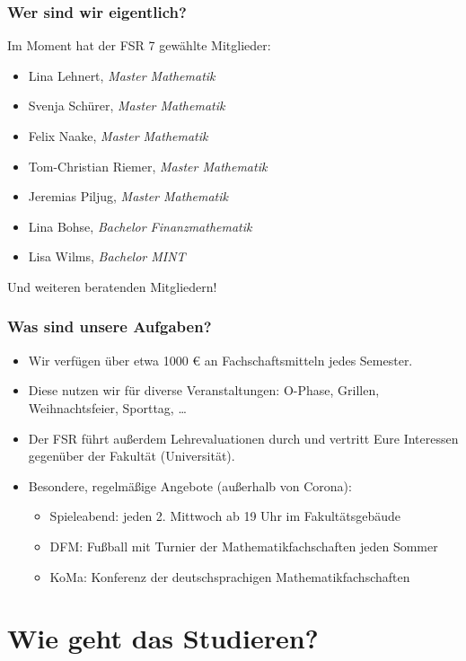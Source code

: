 \documentclass[10pt]{beamer}
\begin{document}
\begin{frame}
	\frametitle{Wer sind wir eigentlich?}

	Im Moment hat der FSR 7 gewählte Mitglieder:

	\begin{itemize}
		\item Lina Lehnert, \textit{Master Mathematik}
		\item Svenja Schürer, \textit{Master Mathematik}
		\item Felix Naake, \textit{Master Mathematik}
		\item Tom-Christian Riemer, \textit{Master Mathematik}
		\item Jeremias Piljug, \textit{Master Mathematik}
		\item Lina Bohse, \textit{Bachelor Finanzmathematik}
		\item Lisa Wilms, \textit{Bachelor MINT}
	\end{itemize}

	Und weiteren beratenden Mitgliedern!
\end{frame}

\begin{frame}
	\frametitle{Was sind unsere Aufgaben?}

	\begin{itemize}
		\item Wir verfügen über etwa 1000 \euro{} an Fachschaftsmitteln jedes Semester.
		\item Diese nutzen wir für diverse Veranstaltungen: O-Phase, Grillen, Weihnachtsfeier, Sporttag, \ldots
		\item Der FSR führt außerdem Lehrevaluationen durch und vertritt Eure Interessen gegenüber der Fakultät (Universität).
		\item Besondere, regelmäßige Angebote (außerhalb von Corona):
			\begin{itemize}
				\item Spieleabend: jeden 2. Mittwoch ab 19 Uhr im Fakultätsgebäude
				\item DFM: Fußball mit Turnier der Mathematikfachschaften jeden Sommer 
				\item KoMa: Konferenz der deutschsprachigen Mathematikfachschaften
			\end{itemize}
	\end{itemize}
\end{frame}


\section{Wie geht das Studieren?}
\frame{\tableofcontents[currentsection]}
\end{document}
